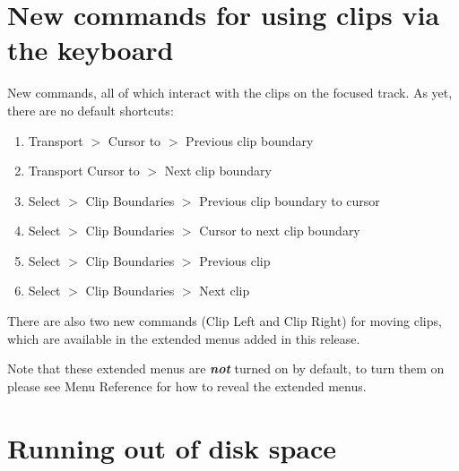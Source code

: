 \section{
New commands for using clips via the keyboard
}


New commands, all of which interact with the clips on the focused track. As yet, there are no default shortcuts:
\begin{enumerate}
\item 
Transport \mbox{$>$} Cursor to \mbox{$>$} Previous clip boundary

\item 
Transport Cursor to \mbox{$>$} Next clip boundary

\item 
Select \mbox{$>$} Clip Boundaries \mbox{$>$} Previous clip boundary to cursor 

\item 
Select \mbox{$>$} Clip Boundaries \mbox{$>$} Cursor to next clip boundary 

\item 
Select \mbox{$>$} Clip Boundaries \mbox{$>$} Previous clip 

\item 
Select \mbox{$>$} Clip Boundaries \mbox{$>$} Next clip 

\end{enumerate}

There are also two new commands (Clip Left and Clip Right) for moving clips, which are available in the extended menus added in this release.

Note that these extended menus are \textit{\textbf{not}} turned on by default, to turn them on please see Menu Reference for how to reveal the extended menus.





\section{
Running out of disk space
}


